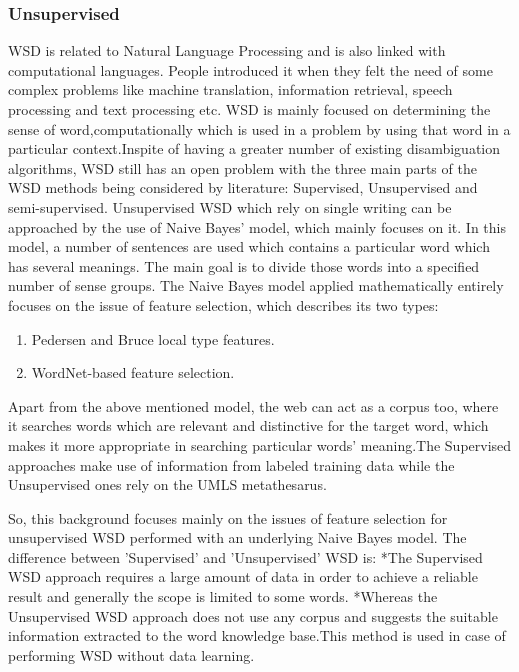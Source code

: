 \subsubsection*{Unsupervised}
WSD is related to Natural Language Processing and is also linked with computational languages. People introduced it when they felt the need of some complex problems like machine translation, information retrieval, speech processing and text processing etc. WSD is mainly focused on determining the sense of word,computationally which is used in a problem by using that word in a particular context.Inspite of having a greater number of existing disambiguation algorithms, WSD still has an open problem with the three main parts of the WSD methods being considered by literature: Supervised, Unsupervised and semi-supervised. Unsupervised WSD which rely on single writing can be approached by the use of Naive Bayes' model, which mainly focuses on it. In this model, a number of sentences are used which contains a particular word which has several meanings. The main goal is to divide those words into a specified number of sense groups\cite{Guenther2003}.
The Naive Bayes model applied mathematically entirely focuses on the issue of feature selection, which describes its two types:

\begin{enumerate}
	\item Pedersen and Bruce local type features.
	\item WordNet-based feature selection.
\end{enumerate}

Apart from the above mentioned model, the web can act as a corpus too, where it searches words which are relevant and distinctive for the target word, which makes it more appropriate in searching particular words' meaning.The Supervised approaches make use of information from labeled training data while the Unsupervised ones rely on the UMLS metathesarus.

So, this background focuses mainly on the issues of feature selection for unsupervised WSD performed with an underlying Naive Bayes model.
The difference between 'Supervised' and 'Unsupervised' WSD is:
*The Supervised WSD approach requires a large amount of data in order to achieve a reliable result and generally the scope is limited to some words.
*Whereas the Unsupervised WSD approach does not use any corpus and suggests the suitable information extracted to the word knowledge base.This method is used in case of performing WSD without data learning.



